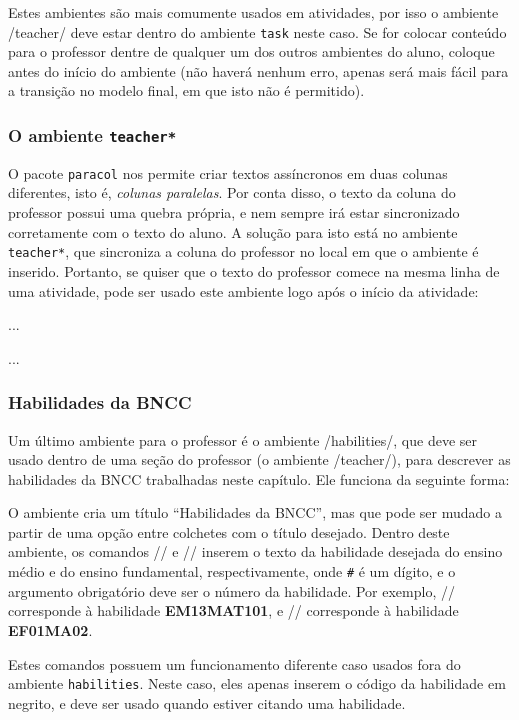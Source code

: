 Estes ambientes são mais comumente usados em atividades, por isso o
ambiente \latexinline/teacher/ deve estar dentro do ambiente
\verb|task| neste caso. Se for colocar conteúdo para o professor dentre
de qualquer um dos outros ambientes do aluno, coloque antes do início
do ambiente (não haverá nenhum erro, apenas será mais fácil para a
transição no modelo final, em que isto não é permitido).

\subsubsection{O ambiente \texttt{teacher*}}\label{sec:teacher-estrela}

O pacote \verb|paracol| nos permite criar textos assíncronos em duas
colunas diferentes, isto é, \emph{colunas paralelas}. Por conta disso,
o texto da coluna do professor possui uma quebra própria, e nem sempre
irá estar sincronizado corretamente com o texto do aluno. A solução
para isto está no ambiente \verb|teacher*|, que sincroniza a coluna do
professor no local em que o ambiente é inserido. Portanto, se quiser
que o texto do professor comece na mesma linha de uma atividade, pode
ser usado este ambiente logo após o início da atividade:

\begin{latexcode}
  \begin{task}
    \begin{teacher*}
      ...
    \end{teacher*}
    ...
  \end{task}
\end{latexcode}

\subsubsection{Habilidades da BNCC}\label{sec:habilidades}

Um último ambiente para o professor é o ambiente
\latexinline/habilities/, que deve ser usado dentro de uma seção do
professor (o ambiente \latexinline/teacher/), para descrever as
habilidades da BNCC trabalhadas neste capítulo. Ele funciona da
seguinte forma:

\begin{latexcode}
\begin{habilities}[titulo]
  \hability{###}
  \efhability{##}{##}
\end{habilities}
\end{latexcode}

O ambiente cria um título \enquote{Habilidades da BNCC}, mas que pode
ser mudado a partir de uma opção entre colchetes com o título desejado.
Dentro deste ambiente, os comandos \latexinline/\hability{###}/ e
\latexinline/\efhability{##}{##}/ inserem o texto da habilidade
desejada do ensino médio e do ensino fundamental, respectivamente, onde
\verb|#| é um dígito, e o argumento obrigatório deve ser o número da
habilidade. Por exemplo, \latexinline// corresponde à
habilidade \textbf{EM13MAT101}, e \latexinline//
corresponde à habilidade \textbf{EF01MA02}.

Estes comandos possuem um funcionamento diferente caso usados fora do
ambiente \verb|habilities|. Neste caso, eles apenas inserem o código da
habilidade em negrito, e deve ser usado quando estiver citando uma
habilidade.


